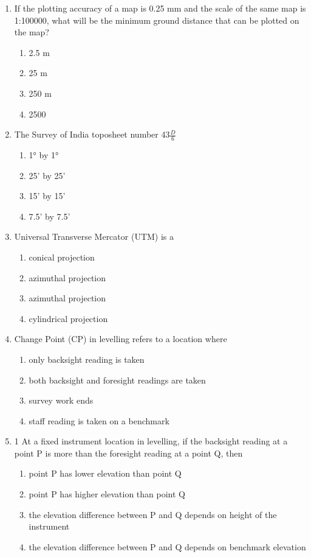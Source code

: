 \documentclass[12pt]{article}
\begin{document}
\begin{enumerate}
\item If the plotting accuracy of a map is 0.25 mm and the scale of the same map is
1:100000, what will be the minimum ground distance that can be plotted on the
map? 

\begin{enumerate}
    \item 2.5 m 
   \item 25 m 
   \item 250 m 
   \item 2500
\end{enumerate}

\item The Survey of India toposheet number 43$\frac{D}{6}$

\begin{enumerate}
    \item 1° by 1° 
   \item 25' by 25' 
   \item 15' by 15' 
   \item 7.5' by 7.5'
\end{enumerate}

\item Universal Transverse Mercator (UTM) is a

\begin{enumerate}
    \item conical projection 
   \item azimuthal projection 
   \item azimuthal projection 
   \item cylindrical projection
\end{enumerate}

\item Change Point (CP) in levelling refers to a location where

\begin{enumerate}
    \item only backsight reading is taken 
   \item both backsight and foresight readings are taken 
   \item survey work ends 
   \item staff reading is taken on a benchmark
\end{enumerate}

\item  1 At a fixed instrument location in levelling, if the backsight reading at a point P is
more than the foresight reading at a point Q, then

\begin{enumerate}
    \item point P has lower elevation than point Q 
   \item point P has higher elevation than point Q 
   \item the elevation difference between P and Q depends on height of the instrument 
   \item the elevation difference between P and Q depends on benchmark elevation
\end{enumerate}


\end{enumerate}
\end{document}

